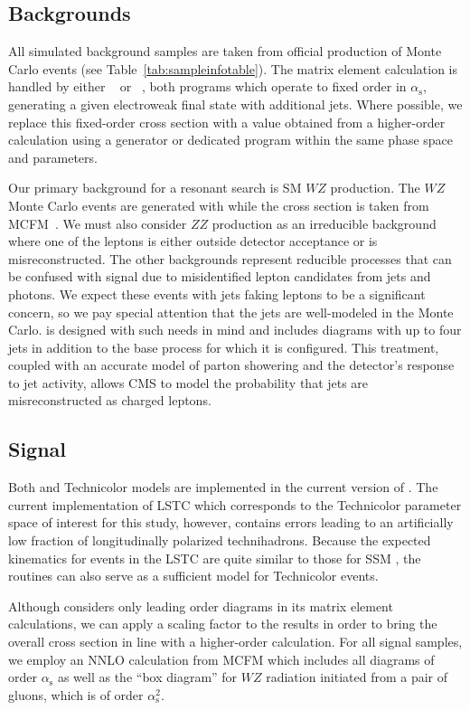 \subsection{Backgrounds}
All simulated background samples are taken from official production of Monte Carlo events (see Table~\ref{tab:sampleinfotable}).  The matrix element calculation is handled by either \MADGRAPH~\cite{MADGRAPH} or \POWHEG~\cite{POWHEG}, both programs which operate to fixed order in $\alpha_\text{s}$, generating a given electroweak final state with additional jets.  Where possible, we replace this fixed-order cross section with a value obtained from a higher-order calculation using a generator or dedicated program within the same phase space and parameters.

Our primary background for a resonant search is SM $WZ$ production.  The $WZ$ Monte Carlo events are generated with \MADGRAPH while the cross section is taken from MCFM~\cite{Campbell:2011bn}.  We must also consider $ZZ$ production as an irreducible background where one of the leptons is either outside detector acceptance or is misreconstructed.  The other backgrounds represent reducible processes that can be confused with signal due to misidentified lepton candidates from jets and photons.  We expect these events with jets faking leptons to be a significant concern, so we pay special attention that the jets are well-modeled in the Monte Carlo.  \MADGRAPH is designed with such needs in mind and includes diagrams with up to four jets in addition to the base process for which it is configured.  This treatment, coupled with an accurate model of parton showering and the detector's response to jet activity, allows CMS to model the probability that jets are misreconstructed as charged leptons.

\subsection{Signal}
Both \wprime and Technicolor models are implemented in the current version of \PYTHIA.  The current implementation of LSTC which corresponds to the Technicolor parameter space of interest for this study, however, contains errors leading to an artificially low fraction of longitudinally polarized technihadrons.  Because the expected kinematics for \technirho{} events in the LSTC are quite similar to those for SSM \wprime, the \PYTHIA \wprime routines can also serve as a sufficient model for Technicolor events.  

Although \PYTHIA considers only leading order diagrams in its matrix element calculations, we can apply a scaling factor to the results in order to bring the overall cross section in line with a higher-order calculation.  For all signal samples, we employ an NNLO calculation from MCFM which includes all diagrams of order $\alpha_\text{s}$ as well as the ``box diagram'' for $WZ$ radiation initiated from a pair of gluons, which is of order $\alpha_\text{s}^2$.

